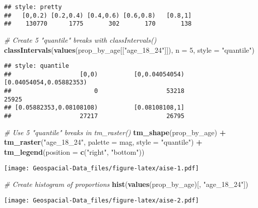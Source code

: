 \documentclass[]{article}
\newenvironment{Shaded}{\begin{snugshade}}{\end{snugshade}}
\newcommand{\CommentTok}[1]{\textcolor[rgb]{0.56,0.35,0.01}{\textit{#1}}}
\newcommand{\DataTypeTok}[1]{\textcolor[rgb]{0.13,0.29,0.53}{#1}}
\newcommand{\DecValTok}[1]{\textcolor[rgb]{0.00,0.00,0.81}{#1}}
\newcommand{\KeywordTok}[1]{\textcolor[rgb]{0.13,0.29,0.53}{\textbf{#1}}}
\newcommand{\NormalTok}[1]{#1}
\newcommand{\OperatorTok}[1]{\textcolor[rgb]{0.81,0.36,0.00}{\textbf{#1}}}
\newcommand{\StringTok}[1]{\textcolor[rgb]{0.31,0.60,0.02}{#1}}
\begin{document}
\begin{verbatim}
## style: pretty
##   [0,0.2) [0.2,0.4) [0.4,0.6) [0.6,0.8)   [0.8,1] 
##    130770      1775       302       170       138
\end{verbatim}

\begin{Shaded}
\begin{Highlighting}[]
\CommentTok{# Create 5 "quantile" breaks with classIntervals()}
\KeywordTok{classIntervals}\NormalTok{(}\KeywordTok{values}\NormalTok{(prop_by_age[[}\StringTok{"age_18_24"}\NormalTok{]]), }
               \DataTypeTok{n =} \DecValTok{5}\NormalTok{, }\DataTypeTok{style =} \StringTok{"quantile"}\NormalTok{)}
\end{Highlighting}
\end{Shaded}

\begin{verbatim}
## style: quantile
##                   [0,0)          [0,0.04054054) [0.04054054,0.05882353) 
##                       0                   53218                   25925 
## [0.05882353,0.08108108)          [0.08108108,1] 
##                   27217                   26795
\end{verbatim}

\begin{Shaded}
\begin{Highlighting}[]
\CommentTok{# Use 5 "quantile" breaks in tm_raster()}
\KeywordTok{tm_shape}\NormalTok{(prop_by_age) }\OperatorTok{+}
\StringTok{  }\KeywordTok{tm_raster}\NormalTok{(}\StringTok{"age_18_24"}\NormalTok{, }\DataTypeTok{palette =}\NormalTok{ mag, }\DataTypeTok{style =} \StringTok{"quantile"}\NormalTok{) }\OperatorTok{+}
\StringTok{  }\KeywordTok{tm_legend}\NormalTok{(}\DataTypeTok{position =} \KeywordTok{c}\NormalTok{(}\StringTok{"right"}\NormalTok{, }\StringTok{"bottom"}\NormalTok{))}
\end{Highlighting}
\end{Shaded}

\texttt{[image: Geospacial-Data\_files/figure-latex/aise-1.pdf]}

\begin{Shaded}
\begin{Highlighting}[]
\CommentTok{# Create histogram of proportions}
\KeywordTok{hist}\NormalTok{(}\KeywordTok{values}\NormalTok{(prop_by_age)[, }\StringTok{"age_18_24"}\NormalTok{])}
\end{Highlighting}
\end{Shaded}

\texttt{[image: Geospacial-Data\_files/figure-latex/aise-2.pdf]}
\end{document}
